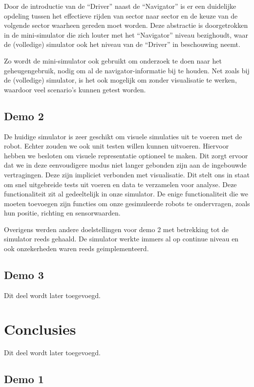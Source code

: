 \documentclass[12pt,a4paper]{report}
\begin{document}
Door de introductie van de ``Driver'' naast de ``Navigator'' is er een duidelijke opdeling tussen het effectieve rijden van sector naar sector en de keuze van de volgende sector waarheen gereden moet worden. Deze abstractie is doorgetrokken in de mini-simulator die zich louter met het ``Navigator'' niveau bezighoudt, waar de (volledige) simulator ook het niveau van de ``Driver'' in beschouwing neemt.

Zo wordt de mini-simulator ook gebruikt om onderzoek te doen naar het geheugengebruik, nodig om al de navigator-informatie bij te houden. Net zoals bij de (volledige) simulator, is het ook mogelijk om zonder visualisatie te werken, waardoor veel scenario's kunnen getest worden.

\section{Demo 2}

De huidige simulator is zeer geschikt om visuele simulaties uit te voeren met de robot. Echter zouden we ook unit testen willen kunnen uitvoeren. Hiervoor hebben we besloten om visuele representatie optioneel te maken. Dit zorgt ervoor dat we in deze eenvoudigere modus niet langer gebonden zijn aan de ingebouwde vertragingen. Deze zijn impliciet verbonden met visualisatie.
Dit stelt ons in staat om snel uitgebreide tests uit voeren en data te verzamelen voor analyse.
Deze functionaliteit zit al gedeeltelijk in onze simulator. De enige functionaliteit die we moeten toevoegen zijn functies om onze gesimuleerde robots te ondervragen, zoals hun positie, richting en sensorwaarden.

Overigens werden andere doelstellingen voor demo 2 met betrekking tot de simulator reeds gehaald. De simulator werkte immers al op continue niveau en ook onzekerheden waren reeds geimplementeerd.

\section{Demo 3}

Dit deel wordt later toegevoegd.

\chapter{Conclusies}

Dit deel wordt later toegevoegd.

\section{Demo 1}
\end{document}
